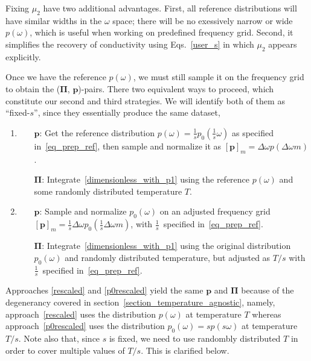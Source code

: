 \documentclass[notitlepage, 11pt, nofootinbib]{revtex4-1}
\renewcommand{\vec}[1]{\bm{#1}}
\begin{document}
Fixing $\mu_2$ have two additional advantages. First, all reference distributions will have similar widths in the $\omega$ space; there will be no exessively narrow or wide $p(\omega)$, which is useful when working on predefined frequency grid. Second, it simplifies the recovery of conductivity using Eqs.~\eqref{user_s} in which $\mu_2$ appears explicitly.

Once we have the reference $p(\omega)$, we must still sample it on the frequency grid to obtain the ($\vec \Pi$, $\vec p$)-pairs. There two equivalent ways to proceed, which constitute our second and third strategies. We will identify both of them as ``fixed-$s$'', since they essentially produce the same dataset,
\begin{enumerate}[resume]
\item \label{rescaled}
\begin{itemize}
    \item[$\vec p$:] Get the reference distribution $p(\omega) = \tfrac{1}{s}p_0(\tfrac{1}{s}\omega)$ as specified in~\eqref{eq_prep_ref}, then sample and normalize it as $[\vec p]_m = \Delta\omega p(\Delta\omega m)$.
    \item[$\vec \Pi$:] Integrate~\eqref{dimensionless_with_p1} using the reference $p(\omega)$ and some randomly distributed temperature $T$.
\end{itemize}
\item \label{p0rescaled}
\begin{itemize}
    \item[$\vec p$:] Sample and normalize $p_0(\omega)$ on an adjusted frequency grid $[\vec p]_m = \frac{1}{s}\Delta\omega p_0(\frac{1}{s}\Delta\omega m)$, with $\frac{1}{s}$~specified in~\eqref{eq_prep_ref}.

    \item[$\vec \Pi$:] Integrate~\eqref{dimensionless_with_p1} using the original distribution $p_0(\omega)$ and randomly distributed temperature, but adjusted as $T/s$ with $\frac{1}{s}$~specified in~\eqref{eq_prep_ref}.
\end{itemize}
\end{enumerate}
Approaches \ref{rescaled} and \ref{p0rescaled} yield the same $\vec p$ and $\vec \Pi$ because of the degenerancy covered in section~\ref{section_temperature_agnostic}, namely, approach~\ref{rescaled} uses the distribution $p(\omega)$ at temperature $T$ whereas approach~\ref{p0rescaled} uses the distribution $p_0(\omega)=sp(s\omega)$ at temperature $T/s$.
Note also that, since $s$ is fixed, we need to use randombly distributed $T$ in order to cover multiple values of $T/s$. This is clarified below.
\end{document}

